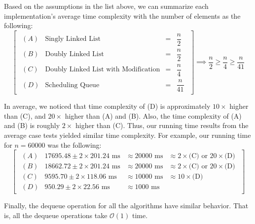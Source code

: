 \documentclass[a4paper,11pt]{kth-mag}
\newcommand*{\skippara}{\par\vspace{\baselineskip} \noindent}
\begin{document}
\skippara Based on the assumptions in the list above, we can summarize each implementation's average time complexity with the number of elements as the following:
\begin{equation*}
    \begin{bmatrix*}
        \begin{array}{llll}
            (A) & \text{Singly Linked List} & = & \dfrac{n}{2} \\[3ex]
            (B) & \text{Doubly Linked List} & = & \dfrac{n}{2} \\[3ex]
            (C) & \text{Doubly Linked List with Modification} & = & \dfrac{n}{4} \\[3ex]
            (D) & \text{Scheduling Queue} & = & \dfrac{n}{41}
        \end{array}
    \end{bmatrix*}
    \implies \frac{n}{2} \ge \frac{n}{4} \ge \frac{n}{41}
\end{equation*}

\skippara In average, we noticed that time complexity of (D) is approximately $10\times$ higher than (C), and $20\times$ higher than (A) and (B).
Also, the time complexity of (A) and (B) is roughly $2\times$ higher than (C).
Thus, our running time results from the average case tests yielded similar time complexity.
For example, our running time for $n=60000$ was the following:
\begin{equation*}
    \begin{bmatrix*}
        \begin{array}{llllll}
            (A) & 17695.48 \pm 2\times 201.24 \text{ ms} & \approx 20000 \text{ ms}  & \approx 2\times\text{(C)}\text{ or } 20\times\text{(D)} \\[1ex]
            (B) & 18662.72 \pm 2\times 201.24 \text{ ms} & \approx 20000 \text{ ms}  & \approx 2\times\text{(C)}\text{ or } 20\times\text{(D)} \\[1ex]
            (C) & 9595.70 \pm 2\times 118.06 \text{ ms} & \approx 10000 \text{ ms} & \approx 10\times\text{(D)} \\[1ex]
            (D) & 950.29 \pm 2\times 22.56 \text{ ms} & \approx 1000 \text{ ms} &
        \end{array}
    \end{bmatrix*}
\end{equation*}

\skippara Finally, the dequeue operation for all the algorithms have similar behavior.
That is, all the dequeue operations take $\mathcal{O}(1)$ time.
\end{document}
